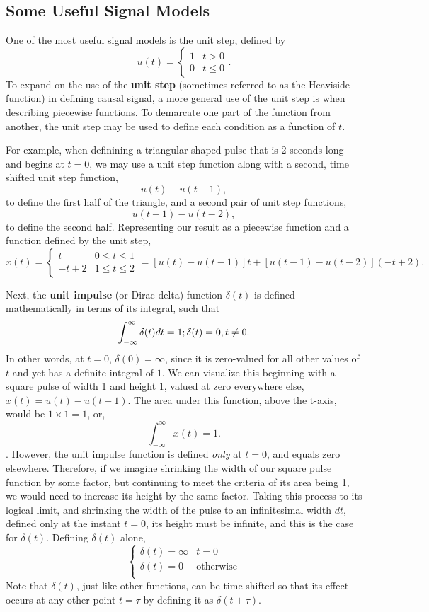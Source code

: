 \documentclass{article}
\begin{document}
\subsection{Some Useful Signal Models}
One of the most useful signal models is the unit step, defined by \[
  u(t) =
	\begin{cases}
		1 & t>0 \\
		0 & t\leq 0
	\end{cases}
.\]
To expand on the use of the \textbf{unit step} (sometimes referred to as the Heaviside function) in defining causal signal, a more general use of the unit step is when describing piecewise functions. To demarcate one part of the function from another, the unit step may be used to define each condition as a function of \(t\). 

For example, when definining a triangular-shaped pulse that is 2 seconds long and begins at \(t=0\), we may use a unit step function along with a second, time shifted unit step function, \[u(t) - u(t-1),\] to define the first half of the triangle, and a second pair of unit step functions, \[u(t-1) - u(t-2),\] to define the second half. Representing our result as a piecewise function and a function defined by the unit step, \[
  x(t) = 
	\begin{cases}
		t & 0 \leq t \leq 1 \\
		-t+2 & 1 \leq t \leq 2
	\end{cases}
	= [u(t) - u(t-1)]t + [u(t-1)-u(t-2)](-t+2).
\]

Next, the \textbf{unit impulse} (or Dirac delta) function \(\delta(t)\) is defined mathematically in terms of its integral, such that \[
  \int_{-\infty}^{\infty}\delta(t)dt = 1; \space \delta(t) = 0, t \neq 0.
\]
In other words, at \(t=0\), \(\delta(0) = \infty\), since it is zero-valued for all other values of \(t\) and yet has a definite integral of \(1\). We can visualize this beginning with a square pulse of width 1 and height 1, valued at zero everywhere else, \(x(t) = u(t) - u(t-1).\) The area under this function, above the t-axis, would be \(1\times1 = 1\), or, \[
  \int_{-\infty}^{\infty}x(t) = 1.
\]. However, the unit impulse function is defined \textit{only} at \(t=0\), and equals zero elsewhere. Therefore, if we imagine shrinking the width of our square pulse function by some factor, but continuing to meet the criteria of its area being 1, we would need to increase its height by the same factor. Taking this process to its logical limit, and shrinking the width of the pulse to an infinitesimal width \(dt\), defined only at the instant \(t=0\), its height must be infinite, and this is the case for \(\delta(t)\). Defining \(\delta(t)\) alone, \[
  \begin{cases}
		\delta(t) = \infty & t=0 \\
		\delta(t) = 0 & \text{otherwise} \\
	\end{cases}
\]
Note that \(\delta(t)\), just like other functions, can be time-shifted so that its effect occurs at any other point \(t=\tau\) by defining it as \(\delta(t\pm\tau)\).
\end{document}
